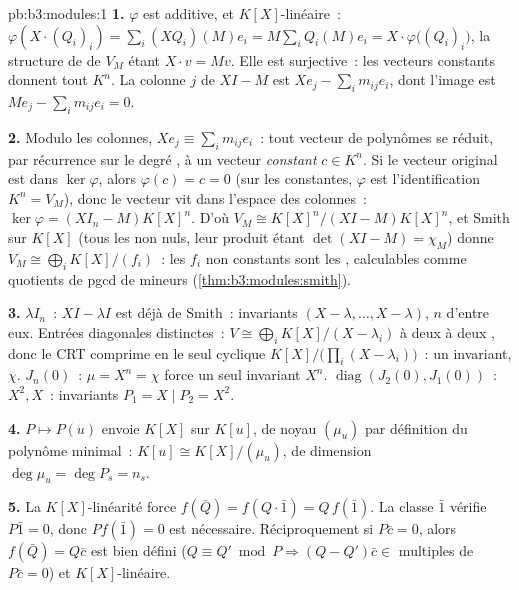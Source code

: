 \begin{solution}{pb:b3:modules:1}
\textbf{1.} $\varphi$ est additive, et $K[X]$-linéaire~:
$\varphi(X \cdot (Q_i)_i) = \sum_i (XQ_i)(M)e_i =
M\sum_i Q_i(M)e_i = X \cdot \varphi\bigl((Q_i)_i\bigr)$, la
structure de  de $V_M$ étant $X \cdot v = Mv$. Elle est
surjective~: les vecteurs constants donnent tout $K^n$. La
colonne $j$ de $XI - M$ est $Xe_j - \sum_i m_{ij}e_i$, dont
l'image est $Me_j - \sum_i m_{ij}e_i = 0$.

\textbf{2.} Modulo les colonnes, $Xe_j \equiv \sum_i m_{ij}e_i$~:
tout vecteur de polynômes se réduit, par récurrence sur le degré
, à un vecteur \emph{constant} $c \in K^n$. Si le vecteur
original est dans $\ker\varphi$, alors $\varphi(c) = c = 0$ (sur
les constantes, $\varphi$ est l'identification $K^n = V_M$),
donc le vecteur vit dans l'espace des colonnes~:
$\ker\varphi = (XI_n - M)K[X]^n$. D'où $V_M \cong
K[X]^n/(XI - M)K[X]^n$, et Smith sur $K[X]$ (tous les  non nuls, leur produit étant $\det(XI - M) =
\chi_M$) donne $V_M \cong \bigoplus_i K[X]/(f_i)$~: les $f_i$
non constants sont les , calculables
comme quotients de pgcd de mineurs
(\cref{thm:b3:modules:smith}).

\textbf{3.} $\lambda I_n$~: $XI - \lambda I$ est déjà de Smith~:
invariants $(X - \lambda, \dots, X - \lambda)$, $n$ d'entre
eux. Entrées diagonales distinctes~: $V \cong \bigoplus_i
K[X]/(X - \lambda_i)$ à  deux à deux , donc le
CRT comprime en le seul cyclique $K[X]/\bigl(\prod_i(X -
\lambda_i)\bigr)$~: un invariant, $\chi$. $J_n(0)$~: $\mu =
X^n = \chi$ force un seul invariant $X^n$.
$\operatorname{diag}(J_2(0), J_1(0))$~: 
$X^2, X$~: invariants $P_1 = X \mid P_2 = X^2$.

\textbf{4.} $P \mapsto P(u)$ envoie $K[X]$ sur $K[u]$, de noyau
$(\mu_u)$ par définition du polynôme minimal~: $K[u] \cong
K[X]/(\mu_u)$, de dimension $\deg\mu_u = \deg P_s = n_s$.

\textbf{5.} La $K[X]$-linéarité force $f(\bar Q) =
f(Q\cdot\bar 1) = Q\,f(\bar 1)$. La classe $\bar 1$ vérifie $P
\bar 1 = 0$, donc $P f(\bar 1) = 0$ est nécessaire.
Réciproquement si $P\bar c = 0$, alors $f(\bar Q) = Q\bar c$
est bien défini ($Q \equiv Q' \bmod P \Rightarrow (Q -
Q')\bar c \in$ multiples de $P\bar c = 0$) et $K[X]$-linéaire.


\end{solution}
